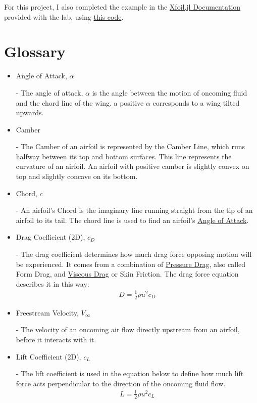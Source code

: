 \documentclass{article}
\begin{document}
For this project, I also completed the example in the \href{https://flow.byu.edu/Xfoil.jl/stable/}{Xfoil.jl Documentation} provided with the lab, using \href{https://github.com/JoeSpencer1/497R-Projects/blob/Airfoil-Analysis/Demo.jl}{this code}.

\clearpage

\section{Glossary}
\begin{itemize}
		
	\item \hypertarget{alpha}{Angle of Attack, $\alpha$} - The angle of attack, $\alpha$ is the angle between the motion of oncoming fluid and the chord line of the wing. a positive $\alpha$ corresponds to a wing tilted upwards.
	
	\item \hypertarget{Camber}{Camber} - The Camber of an airfoil is represented by the Camber Line, which runs halfway between its top and bottom surfaces. This line represents the curvature of an airfoil. An airfoil with positive camber is slightly convex on top and slightly concave on its bottom.
	
	\item \hypertarget{c}{Chord, $c$} - An airfoil's Chord is the imaginary line running straight from the tip of an airfoil to its tail. The chord line is used to find an airfoil's \hyperlink{alpha}{Angle of Attack}.

	\item \hypertarget{CD}{Drag Coefficient (2D), $c_{D}$} - The drag coefficient determines how much drag force opposing motion will be experienced. It comes from a combination of \hyperlink{DP}{Pressure Drag}, also called Form Drag, and \hyperlink{VD}{Viscous Drag} or Skin Friction. The drag force equation describes it in this way: 
		\begin{equation} \label{eq:13}
		\begin{aligned}
        			D = \frac{1}{2} \rho u^{2} c_{D}
	    	\end{aligned}
		\end{equation}
	
	\item \hypertarget{Vinf}{Freestream Velocity, $V_{\infty}$} - The velocity of an oncoming air flow directly upstream from an airfoil, before it interacts with it.
		
	\item \hypertarget{CL}{Lift Coefficient (2D), $c_{L}$} - The lift coefficient is used in the equation below to define how much lift force acts perpendicular to the direction of the oncoming fluid flow.
		\begin{equation} \label{eq:14}
		\begin{aligned}
        			L = \frac{1}{2} \rho u^{2} c_{L}
	    	\end{aligned}
		\end{equation}
	

\end{itemize}
\end{document}
